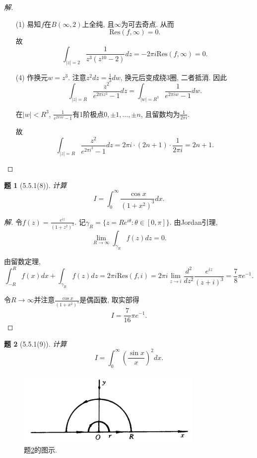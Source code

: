 \documentclass{article}[a4paper, 12pt]
\theoremstyle{mystyle}
\newtheorem{problem}{题}
\newenvironment{solution}{\begin{proof}[解]}{\end{proof}}
\begin{document}
\begin{solution}
  \begin{itemize}
    \item [(1)] 易知\(f\)在\(B(\infty,2)\)上全纯, 且\(\infty\)为可去奇点. 从而\[\text{Res}(f,\infty)=0.\] 故\[\int_{|z|=2}\frac{1}{z^3(z^{10}-2)}dz=-2\pi i\text{Res}(f,\infty)=0.\]
    \item [(4)] 作换元\(w=z^3\). 注意\(z^2dz=\frac13dw\), 换元后变成绕3圈, 二者抵消. 因此\[\int_{|z|=R}\frac{z^2}{e^{2\pi i z^3}-1}dz = \int_{|w|=R^3}\frac{1}{e^{2\pi i w}-1}dw.\]
    
    在\(|w|<R^3\), \(\frac{1}{e^{2\pi i w}-1}\)有1阶极点\(0,\pm1,\dots,\pm n\), 且留数均为\(\frac{1}{2\pi i}\).

    故\[\int_{|z|=R}\frac{z^2}{e^{2\pi i ^3}-1}dz=2\pi i\cdot(2n+1)\cdot\frac{1}{2\pi i}=2n+1. \tag*{\(\qed\)}\]
  \end{itemize}
  \renewcommand{\qedsymbol}{}
\end{solution}

\begin{problem}[5.5.1(8)]
  计算\[I=\int_0^\infty \frac{\cos x}{(1+x^2)^3}dx.\]
\end{problem}

\begin{solution}
  令\(f(z)=\frac{e^{iz}}{(1+z^2)^3}\). 记\(\gamma_R=\{z=Re^{i\theta}:\theta\in[0,\pi]\}\). 由Jordan引理, \[\lim_{R\to\infty}\int_{\gamma_R}f(z)dz=0.\]

  由留数定理, \[\int_{-R}^R f(x)dx+\int_{\gamma_R}f(z)dz=2\pi i\text{Res}(f, i)=2\pi i\lim_{z\to i}\frac{d^2}{dz^2}\frac{e^{iz}}{(z+i)^3}=\frac{7}{8}\pi e^{-1}.\]

  令\(R\to \infty\)并注意\(\frac{\cos x}{(1+x^2)^3}\)是偶函数, 取实部得\[I=\frac{7}{16}\pi e^{-1}.\tag*{\(\qed\)}\]
  \renewcommand{\qedsymbol}{}
\end{solution}

\begin{problem}[5.5.1(9)] \label{9}
  计算\[I=\int_0^\infty \left(\frac{\sin x}{x}\right)^2dx.\]
\end{problem}

\begin{figure}[htbp]
  \centering
  \includegraphics[width=0.8\textwidth]{images/9.png}
  \caption{题\ref{9}的图示.}
  \label{fig:9}
\end{figure}
\end{document}
